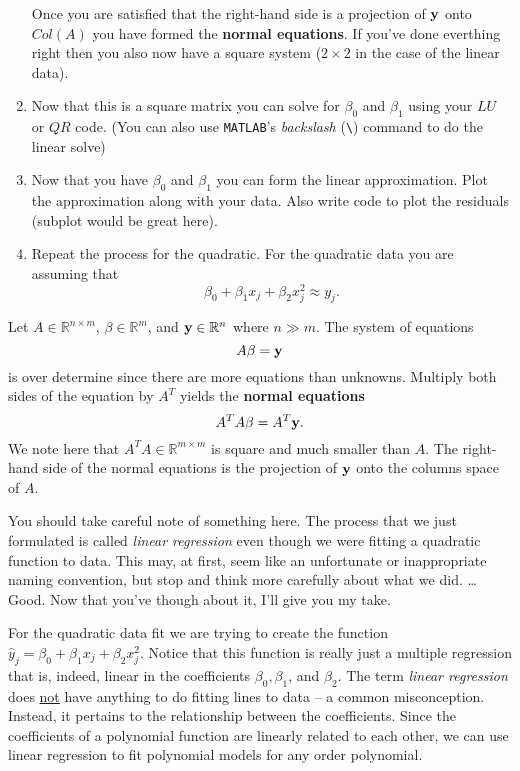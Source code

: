 \begin{problem}
\begin{enumerate}
            Once you are satisfied that the right-hand side is a projection of ${\bf y}$ onto
            $Col(A)$ you have formed the {\bf normal equations}.  If you've done everthing
            right then you also now have a square system ($2 \times 2$ in the case of the
            linear data).

        \item Now that this is a square matrix you can solve for $\beta_0$ and $\beta_1$ using
            your $LU$ or $QR$ code. \ifnum{} (You can also use \texttt{MATLAB}'s {\it backslash} (\verb|\|) command to
            do the linear solve)\fi
        \item Now that you have $\beta_0$ and $\beta_1$ you can form the linear approximation.
            Plot the approximation along with your data.  Also write code to plot the
            residuals (subplot would be great here).
        \item Repeat the process for the quadratic.  For the quadratic data
            you are assuming that 
            \[ \beta_0 + \beta_1 x_j + \beta_2 x_j^2 \approx y_j. \]
    \end{enumerate}
\end{problem}


\begin{definition}
    Let $A \in \mathbb{R}^{n \times m}$, $\beta \in \mathbb{R}^{m}$, and ${\bf y} \in
    \mathbb{R}^n$ where $n \gg m$.  The system of equations
    \[ A \beta = {\bf y} \]
    is over determine since there are more equations than unknowns.  Multiply both sides
    of the equation by $A^T$ yields the {\bf normal equations}
    \[ A^T A \beta = A^T {\bf y}. \]
    We note here that $A^T A \in \mathbb{R}^{m \times m}$ is square and much smaller than
    $A$.  The right-hand side of the normal equations is the projection of ${\bf y}$ onto the
    columns space of $A$.  
\end{definition}

You should take careful note of something here.  The process that we just formulated is
called {\it linear regression} even though we were fitting a quadratic function to data.
This may, at first, seem like an unfortunate or inappropriate naming convention, but stop
and think more carefully about what we did.  \ldots Good.  Now that you've though about
it, I'll give you my take.  

For the quadratic data fit we are trying to create the function $\hat{y}_j = \beta_0 +
\beta_1 x_j + \beta_2 x_j^2$.  Notice that this function is really just a multiple
regression that is, indeed, linear in the coefficients $\beta_0, \beta_1$, and $\beta_2$.
The term {\it linear regression} does \underline{not} have anything to do fitting lines to
data -- a common misconception.  Instead, it pertains to the relationship between the coefficients.
Since the coefficients of a polynomial function are linearly related to
each other, we can use linear regression to fit polynomial models for any order
polynomial.  

